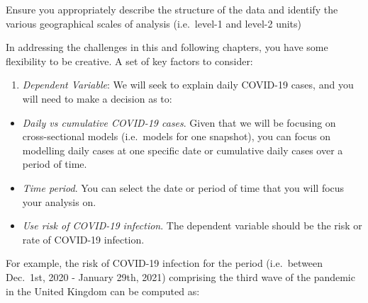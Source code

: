 \documentclass[
]{book}
\newenvironment{Shaded}{\begin{snugshade}}{\end{snugshade}}
\newcommand{\CommentTok}[1]{\textcolor[rgb]{0.56,0.35,0.01}{\textit{#1}}}
\newcommand{\DataTypeTok}[1]{\textcolor[rgb]{0.13,0.29,0.53}{#1}}
\newcommand{\DecValTok}[1]{\textcolor[rgb]{0.00,0.00,0.81}{#1}}
\newcommand{\KeywordTok}[1]{\textcolor[rgb]{0.13,0.29,0.53}{\textbf{#1}}}
\newcommand{\NormalTok}[1]{#1}
\newcommand{\OperatorTok}[1]{\textcolor[rgb]{0.81,0.36,0.00}{\textbf{#1}}}
\newcommand{\OtherTok}[1]{\textcolor[rgb]{0.56,0.35,0.01}{#1}}
\newcommand{\StringTok}[1]{\textcolor[rgb]{0.31,0.60,0.02}{#1}}
\providecommand{\tightlist}{%
  \setlength{\itemsep}{0pt}\setlength{\parskip}{0pt}}
\begin{document}
Ensure you appropriately describe the structure of the data and identify the various geographical scales of
analysis (i.e.~level-1 and level-2 units)

In addressing the challenges in this and following chapters, you have some flexibility to be creative. A set of key factors to consider:

\begin{enumerate}
\def\labelenumi{\arabic{enumi}.}
\tightlist
\item
  \emph{Dependent Variable}: We will seek to explain daily COVID-19 cases, and you will need to make a decision as to:
\end{enumerate}

\begin{itemize}
\item
  \emph{Daily vs cumulative COVID-19 cases}. Given that we will be focusing on cross-sectional models (i.e.~models for one snapshot), you can focus on modelling daily cases at one specific date or cumulative daily cases over a period of time.
\item
  \emph{Time period}. You can select the date or period of time that you will focus your analysis on.
\item
  \emph{Use risk of COVID-19 infection}. The dependent variable should be the risk or rate of COVID-19 infection.
\end{itemize}

For example, the risk of COVID-19 infection for the period (i.e.~between Dec.~1st, 2020 - January 29th, 2021) comprising the third wave of the pandemic in the United Kingdom can be computed as:

\begin{Shaded}
\end{Shaded}
\end{document}
